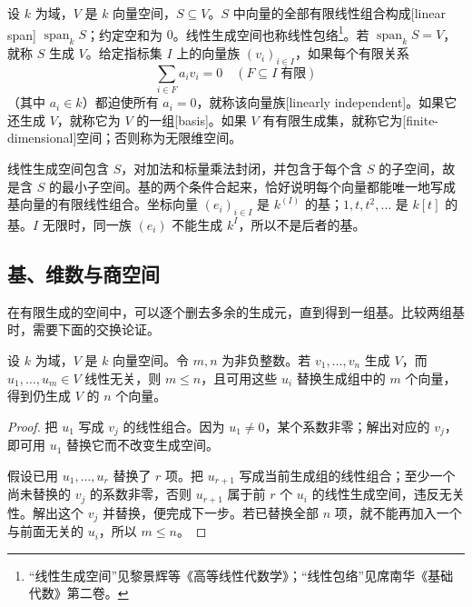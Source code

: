 \begin{definition}\label{b2:def:linear-span-basis}
	设 \(k\) 为域，\(V\) 是 \(k\) 向量空间，\(S\subseteq V\)。\(S\) 中向量的全部有限线性组合构成[linear span] \(\operatorname{span}_kS\)；约定空和为 \(0\)。线性生成空间也称线性包络\footnote{“线性生成空间”见黎景辉等《高等线性代数学》\cite[定义 1.13, p. 4]{LiBaiZhou2014AdvancedLinearAlgebra}；“线性包络”见席南华《基础代数》第二卷\cite[§1.2, p. 5]{Xi2018BasicAlgebraII}。}。若 \(\operatorname{span}_kS=V\)，就称 \(S\) 生成 \(V\)。给定指标集 \(I\) 上的向量族 \((v_i)_{i\in I}\)，如果每个有限关系
	\[
		\sum_{i\in F}a_iv_i=0\quad(F\subseteq I\;\text{有限})
	\]
	（其中 \(a_i\in k\)）都迫使所有 \(a_i=0\)，就称该向量族[linearly independent]。如果它还生成 \(V\)，就称它为 \(V\) 的一组[basis]。如果 \(V\) 有有限生成集，就称它为[finite-dimensional]空间；否则称为无限维空间。
\end{definition}

线性生成空间包含 \(S\)，对加法和标量乘法封闭，并包含于每个含 \(S\) 的子空间，故是含 \(S\) 的最小子空间。基的两个条件合起来，恰好说明每个向量都能唯一地写成基向量的有限线性组合。坐标向量 \((e_i)_{i\in I}\) 是 \(k^{(I)}\) 的基；\(1,t,t^2,\ldots\) 是 \(k[t]\) 的基。\(I\) 无限时，同一族 \((e_i)\) 不能生成 \(k^I\)，所以不是后者的基。

\subsection{基、维数与商空间}
\label{b2:subsec:0101:02}

在有限生成的空间中，可以逐个删去多余的生成元，直到得到一组基。比较两组基时，需要下面的交换论证。

\begin{lemma}[有限交换引理]\label{b2:lem:finite-exchange}
	设 \(k\) 为域，\(V\) 是 \(k\) 向量空间。令 \(m,n\) 为非负整数。若 \(v_1,\ldots,v_n\) 生成 \(V\)，而 \(u_1,\ldots,u_m\in V\) 线性无关，则 \(m\le n\)，且可用这些 \(u_i\) 替换生成组中的 \(m\) 个向量，得到仍生成 \(V\) 的 \(n\) 个向量。
\end{lemma}
\begin{proof}
	把 \(u_1\) 写成 \(v_j\) 的线性组合。因为 \(u_1\ne0\)，某个系数非零；解出对应的 \(v_j\)，即可用 \(u_1\) 替换它而不改变生成空间。

	假设已用 \(u_1,\ldots,u_r\) 替换了 \(r\) 项。把 \(u_{r+1}\) 写成当前生成组的线性组合；至少一个尚未替换的 \(v_j\) 的系数非零，否则 \(u_{r+1}\) 属于前 \(r\) 个 \(u_i\) 的线性生成空间，违反无关性。解出这个 \(v_j\) 并替换，便完成下一步。若已替换全部 \(n\) 项，就不能再加入一个与前面无关的 \(u_i\)，所以 \(m\le n\)。
\end{proof}

